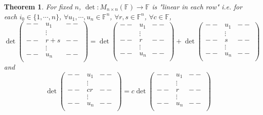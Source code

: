 \documentclass[12pt]{article}
\newtheorem{theorem}{Theorem}[subsection]
\newcommand{\mF}{{\mathbb{F}}}
\begin{document}
\begin{theorem}
	For fixed $n$, $\det: M_{n\times n}(\mF)\to \mF$ is "linear in each row"
	i.e. for each $i_0 \in \{1, \cdots, n\}$, $\forall u_1, \cdots, u_n \in
	\mF^n$, $\forall r, s\in \mF^n$, $\forall c \in \mF$, 
	\[
		\det
		\begin{pmatrix}
			--	& u_1 &	--	\\
				& \vdots &	\\
			--	& r+s &	--	\\
				& \vdots &	\\
			--	& u_n &	--	\\
		\end{pmatrix}
		= 
		\det
		\begin{pmatrix}
			--	& u_1 &	--	\\
				& \vdots &	\\
			--	& r &	--	\\
				& \vdots &	\\
			--	& u_n &	--	\\
		\end{pmatrix}
		+
		\det
		\begin{pmatrix}
			--	& u_1 &	--	\\
				& \vdots &	\\
			--	& s &	--	\\
				& \vdots &	\\
			--	& u_n &	--	\\
		\end{pmatrix}
	\]
	and 
	\[
		\det
		\begin{pmatrix}
			--	& u_1 &	--	\\
				& \vdots &	\\
			--	& cr &	--	\\
				& \vdots &	\\
			--	& u_n &	--	\\
		\end{pmatrix}
		= c
		\det
		\begin{pmatrix}
			--	& u_1 &	--	\\
				& \vdots &	\\
			--	& r &	--	\\
				& \vdots &	\\
			--	& u_n &	--	\\
		\end{pmatrix}
	\]
\end{theorem}
\end{document}

